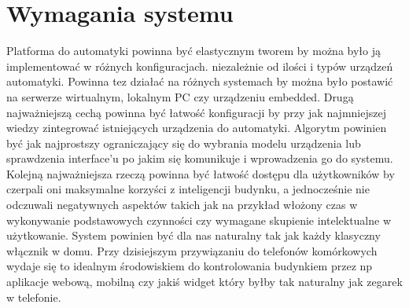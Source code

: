 \chapter{Wymagania systemu}
Platforma do automatyki powinna być elastycznym tworem by można było ją implementować w różnych konfiguracjach. niezależnie od ilości i typów urządzeń automatyki. Powinna tez działać na różnych systemach by można było postawić na serwerze wirtualnym, lokalnym PC czy urządzeniu embedded. Drugą najważniejszą cechą powinna być łatwość konfiguracji by przy jak najmniejszej wiedzy zintegrować istniejących urządzenia do automatyki. Algorytm powinien być jak najprostszy ograniczający się do wybrania modelu urządzenia lub sprawdzenia interface'u po jakim się komunikuje i wprowadzenia go do systemu. Kolejną najważniejsza rzeczą powinna być łatwość dostępu dla użytkowników by czerpali oni maksymalne korzyści z inteligencji budynku, a jednocześnie nie odczuwali negatywnych aspektów takich jak na przykład włożony czas w wykonywanie podstawowych czynności czy wymagane skupienie intelektualne w użytkowanie. System powinien być dla nas naturalny tak jak każdy klasyczny włącznik w domu. Przy dzisiejszym przywiązaniu do telefonów komórkowych wydaje się to idealnym środowiskiem do kontrolowania budynkiem przez np aplikacje webową, mobilną czy jakiś widget który byłby tak naturalny jak zegarek w telefonie. 